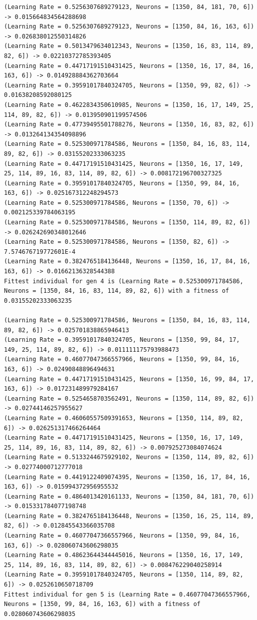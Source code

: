\documentclass{report}
\begin{document}
\begin{verbatim}
(Learning Rate = 0.5256307689279123, Neurons = [1350, 84, 181, 70, 6]) -> 0.015664834564288698
(Learning Rate = 0.5256307689279123, Neurons = [1350, 84, 16, 163, 6]) -> 0.026838012550314826
(Learning Rate = 0.5013479634012343, Neurons = [1350, 16, 83, 114, 89, 82, 6]) -> 0.02210372785393405
(Learning Rate = 0.44717191510431425, Neurons = [1350, 16, 17, 84, 16, 163, 6]) -> 0.014928884362703664
(Learning Rate = 0.39591017840324705, Neurons = [1350, 99, 82, 6]) -> 0.01638208592080125
(Learning Rate = 0.4622834350610985, Neurons = [1350, 16, 17, 149, 25, 114, 89, 82, 6]) -> 0.013950901199574506
(Learning Rate = 0.47739495501788276, Neurons = [1350, 16, 83, 82, 6]) -> 0.013264134354098896
(Learning Rate = 0.525300971784586, Neurons = [1350, 84, 16, 83, 114, 89, 82, 6]) -> 0.03155202333063235
(Learning Rate = 0.44717191510431425, Neurons = [1350, 16, 17, 149, 25, 114, 89, 16, 83, 114, 89, 82, 6]) -> 0.008172196700327325
(Learning Rate = 0.39591017840324705, Neurons = [1350, 99, 84, 16, 163, 6]) -> 0.025167312248294573
(Learning Rate = 0.525300971784586, Neurons = [1350, 70, 6]) -> 0.002125339784063195
(Learning Rate = 0.525300971784586, Neurons = [1350, 114, 89, 82, 6]) -> 0.026242690348012646
(Learning Rate = 0.525300971784586, Neurons = [1350, 82, 6]) -> 7.574676719772601E-4
(Learning Rate = 0.3824765184136448, Neurons = [1350, 16, 17, 84, 16, 163, 6]) -> 0.01662136328544388
Fittest individual for gen 4 is (Learning Rate = 0.525300971784586, Neurons = [1350, 84, 16, 83, 114, 89, 82, 6]) with a fitness of 0.03155202333063235

(Learning Rate = 0.525300971784586, Neurons = [1350, 84, 16, 83, 114, 89, 82, 6]) -> 0.025701838865946413
(Learning Rate = 0.39591017840324705, Neurons = [1350, 99, 84, 17, 149, 25, 114, 89, 82, 6]) -> 0.011111175793988473
(Learning Rate = 0.46077047366557966, Neurons = [1350, 99, 84, 16, 163, 6]) -> 0.02490848896494631
(Learning Rate = 0.44717191510431425, Neurons = [1350, 16, 99, 84, 17, 163, 6]) -> 0.017231489979284167
(Learning Rate = 0.5254658703562491, Neurons = [1350, 114, 89, 82, 6]) -> 0.02744146257955627
(Learning Rate = 0.46060557509391653, Neurons = [1350, 114, 89, 82, 6]) -> 0.026251317466264464
(Learning Rate = 0.44717191510431425, Neurons = [1350, 16, 17, 149, 25, 114, 89, 16, 83, 114, 89, 82, 6]) -> 0.007925273084074624
(Learning Rate = 0.5133244675929102, Neurons = [1350, 114, 89, 82, 6]) -> 0.02774000712777018
(Learning Rate = 0.4419122409074395, Neurons = [1350, 16, 17, 84, 16, 163, 6]) -> 0.015994372956955532
(Learning Rate = 0.4864013420161133, Neurons = [1350, 84, 181, 70, 6]) -> 0.015331784077198748
(Learning Rate = 0.3824765184136448, Neurons = [1350, 16, 25, 114, 89, 82, 6]) -> 0.012845543366035708
(Learning Rate = 0.46077047366557966, Neurons = [1350, 99, 84, 16, 163, 6]) -> 0.028060743606298035
(Learning Rate = 0.48623644344445016, Neurons = [1350, 16, 17, 149, 25, 114, 89, 16, 83, 114, 89, 82, 6]) -> 0.008476229040258914
(Learning Rate = 0.39591017840324705, Neurons = [1350, 114, 89, 82, 6]) -> 0.0252610650718709
Fittest individual for gen 5 is (Learning Rate = 0.46077047366557966, Neurons = [1350, 99, 84, 16, 163, 6]) with a fitness of 0.028060743606298035
\end{verbatim}
\normalsize
\end{document}
